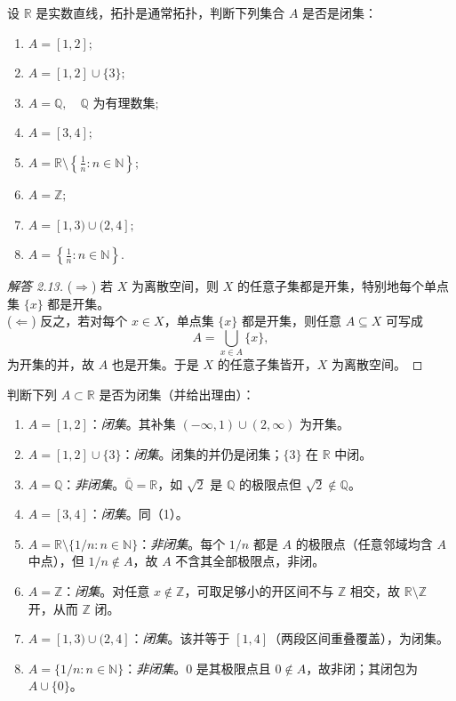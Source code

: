 \begin{exercise}
设 $\mathbb{R}$ 是实数直线，拓扑是通常拓扑，判断下列集合 $A$ 是否是闭集：  
\begin{enumerate}
  \item $A = [1,2];$
  \item $A = [1,2]\cup\{3\};$
  \item $A = \mathbb{Q}, \quad \mathbb{Q}$ 为有理数集;
  \item $A = [3,4];$
  \item $A = \mathbb{R}\setminus\left\{\tfrac{1}{n}:n\in\mathbb{N}\right\};$
  \item $A = \mathbb{Z};$
  \item $A = [1,3)\cup(2,4];$
  \item $A = \left\{\tfrac{1}{n}:n\in\mathbb{N}\right\}.$
\end{enumerate}
\end{exercise}
\begin{proof}[解答 2.13]
($\Rightarrow$) 若 $X$ 为离散空间，则 $X$ 的任意子集都是开集，特别地每个单点集 $\{x\}$ 都是开集。\\
($\Leftarrow$) 反之，若对每个 $x\in X$，单点集 $\{x\}$ 都是开集，则任意 $A\subseteq X$ 可写成
\[
A=\bigcup_{x\in A}\{x\},
\]
为开集的并，故 $A$ 也是开集。于是 $X$ 的任意子集皆开，$X$ 为离散空间。
\end{proof}

\begin{solution}[解答 2.14]
判断下列 $A\subset\mathbb{R}$ 是否为闭集（并给出理由）：
\begin{enumerate}
  \item $A=[1,2]$：\emph{闭集}。其补集 $(-\infty,1)\cup(2,\infty)$ 为开集。
  \item $A=[1,2]\cup\{3\}$：\emph{闭集}。闭集的并仍是闭集；$\{3\}$ 在 $\mathbb{R}$ 中闭。
  \item $A=\mathbb{Q}$：\emph{非闭集}。$\overline{\mathbb{Q}}=\mathbb{R}$，如 $\sqrt2$ 是 $\mathbb{Q}$ 的极限点但 $\sqrt2\notin\mathbb{Q}$。
  \item $A=[3,4]$：\emph{闭集}。同（1）。
  \item $A=\mathbb{R}\setminus\{1/n:n\in\mathbb{N}\}$：\emph{非闭集}。每个 $1/n$ 都是 $A$ 的极限点（任意邻域均含 $A$ 中点），但 $1/n\notin A$，故 $A$ 不含其全部极限点，非闭。
  \item $A=\mathbb{Z}$：\emph{闭集}。对任意 $x\notin\mathbb{Z}$，可取足够小的开区间不与 $\mathbb{Z}$ 相交，故 $\mathbb{R}\setminus\mathbb{Z}$ 开，从而 $\mathbb{Z}$ 闭。
  \item $A=[1,3)\cup(2,4]$：\emph{闭集}。该并等于 $[1,4]$（两段区间重叠覆盖），为闭集。
  \item $A=\{1/n:n\in\mathbb{N}\}$：\emph{非闭集}。$0$ 是其极限点且 $0\notin A$，故非闭；其闭包为 $A\cup\{0\}$。
\end{enumerate}

\end{solution}





